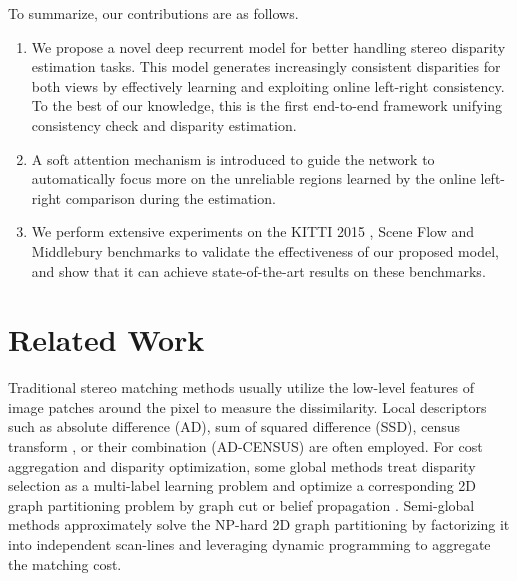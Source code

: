\documentclass[10pt,twocolumn,letterpaper]{article}
\begin{document}
To summarize, our contributions are as follows.
\begin{enumerate}
	\setlength\itemsep{0em}
	\vspace{-0.1cm}
	\item We propose a novel  deep recurrent model for better handling  stereo disparity estimation tasks. This model generates increasingly  consistent disparities for both views by effectively learning and exploiting online left-right consistency.  To the best of our knowledge, this is the first end-to-end framework unifying consistency check and disparity estimation. 
	\vspace{-0.1cm} 
	\item A soft attention mechanism is introduced to guide the network to automatically focus more on the  unreliable regions  learned by the online left-right comparison during the estimation.
	\vspace{-0.1cm} 
	\item We perform extensive experiments on the KITTI 2015 \cite{Menze2015CVPR, Menze2015ISA}, Scene Flow \cite{mayer2016large} and Middlebury \cite{scharstein2002middlebury} benchmarks to validate the effectiveness of our proposed model, and show that it can achieve state-of-the-art results on these benchmarks.
\end{enumerate}
\section{Related Work}


Traditional stereo matching methods usually utilize the low-level features of image patches around the pixel to measure the dissimilarity. Local descriptors such as absolute difference (AD), sum of squared difference (SSD), census transform \cite{humenberger2010census}, or their combination (AD-CENSUS) \cite{mei2011building} are often employed. For cost aggregation and disparity optimization, some   global methods   treat disparity selection as a multi-label learning problem and optimize a  corresponding 2D graph partitioning problem  by  graph cut \cite{bleyer2007graph} or belief propagation \cite{felzenszwalb2006efficient, sun2003stereo, yang2010constant}. Semi-global methods \cite{hirschmuller2008stereo}  approximately solve  the NP-hard 2D graph partitioning by factorizing it into independent scan-lines and leveraging dynamic programming to aggregate the matching cost.
\end{document}
